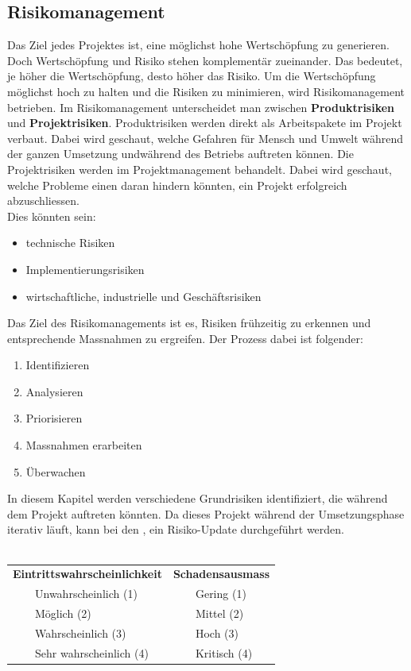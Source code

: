 \documentclass[a4paper, table]{article}
\newcommand{\tabitem}{~~\llap{\textbullet}~~}
\begin{document}
\clearpage
\subsection{Risikomanagement}
Das Ziel jedes Projektes ist, eine möglichst hohe Wertschöpfung zu generieren. 
Doch Wertschöpfung und Risiko stehen komplementär zueinander. 
Das bedeutet, je höher die Wertschöpfung, desto höher das Risiko. 
Um die Wertschöpfung möglichst hoch zu halten und die Risiken zu minimieren, wird Risikomanagement betrieben. 
Im Risikomanagement unterscheidet man zwischen \textbf{Produktrisiken} und \textbf{Projektrisiken}. \autocite[p.~8-16]{peter_sollberger_risikomanagement_2021}
Produktrisiken werden direkt als Arbeitspakete im Projekt verbaut. 
Dabei wird geschaut, welche Gefahren für Mensch und Umwelt während der ganzen Umsetzung undwährend des Betriebs auftreten können.
Die Projektrisiken werden im Projektmanagement behandelt. 
Dabei wird geschaut, welche Probleme einen daran hindern könnten, ein Projekt erfolgreich abzuschliessen. \\
Dies könnten sein:
\begin{itemize}
    \item technische Risiken
    \item Implementierungsrisiken
    \item wirtschaftliche, industrielle und Geschäftsrisiken
\end{itemize}
\noindent
Das Ziel des Risikomanagements ist es, Risiken frühzeitig zu erkennen und entsprechende Massnahmen zu ergreifen. 
Der Prozess dabei ist folgender:
\begin{enumerate}
    \item Identifizieren
    \item Analysieren
    \item Priorisieren
    \item Massnahmen erarbeiten
    \item Überwachen
\end{enumerate}
In diesem Kapitel werden verschiedene Grundrisiken identifiziert, die während dem Projekt auftreten könnten. 
Da dieses Projekt während der Umsetzungsphase iterativ läuft, kann bei den , ein Risiko-Update durchgeführt werden.\\\\

\begin{tabular}[h]{ll}
    \textbf{Eintrittswahrscheinlichkeit} & \textbf{Schadensausmass} \\
    \tabitem Unwahrscheinlich (1) & \tabitem Gering (1) \\
    \tabitem Möglich (2) & \tabitem Mittel (2) \\
    \tabitem Wahrscheinlich (3) & \tabitem Hoch (3) \\
    \tabitem Sehr wahrscheinlich (4) & \tabitem Kritisch (4) \\
\end{tabular}
\clearpage
\end{document}
